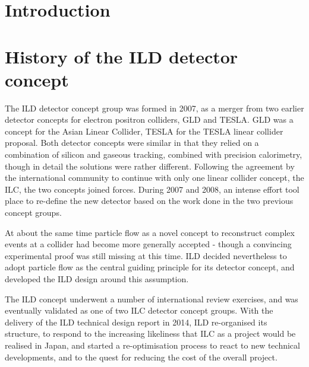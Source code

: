 \documentclass[%
 preprint,
 amsmath,amssymb,
 aps,
]{revtex4-1}
\begin{document}
\maketitle

\tableofcontents

\section{\label{sec:level1}Introduction}

\section{History of the ILD detector concept}
The ILD detector concept group was formed in 2007, as a merger from two earlier detector concepts for electron positron colliders, GLD and TESLA. GLD was a concept for the Asian Linear Collider, TESLA for the TESLA linear collider proposal. Both detector concepts were similar in that they relied on a combination of silicon and gaseous tracking, combined with precision calorimetry, though in detail the solutions were rather different. Following the agreement by the international community to continue with only one linear collider concept, the ILC, the two concepts joined forces. During 2007 and 2008, an intense effort tool place to re-define the new detector based on the work done in the two previous concept groups. 

At about the same time particle flow as a novel concept to reconstruct complex events at a collider had become more generally accepted - though a convincing experimental proof was still missing at this time. ILD decided nevertheless to adopt particle flow as the central guiding principle for its detector concept, and developed the ILD design around this assumption. 

The ILD concept underwent a number of international review exercises, and was eventually validated as one of two ILC detector concept groups. With the delivery of the ILD technical design report in 2014, ILD re-organised its structure, to respond to the increasing likeliness that ILC as a project would be realised in Japan, and started a re-optimisation process to react to new technical developments, and to the quest for reducing the cost of the overall project. 
\end{document}
